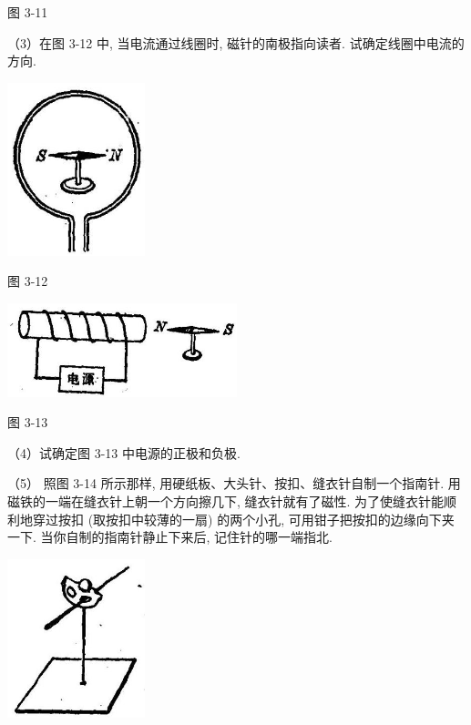 \documentclass[10pt]{article}
\begin{document}
图 3-11

（3）在图 3-12 中, 当电流通过线圈时, 磁针的南极指向读者. 试确定线圈中电流的方向.

\begin{center}
\includegraphics[max width=0.3\textwidth]{images/01913056-1f15-74d8-9184-9aab52c9d66b_109_304164.jpg}
\end{center}

图 3-12

\begin{center}
\includegraphics[max width=0.5\textwidth]{images/01913056-1f15-74d8-9184-9aab52c9d66b_109_456456.jpg}
\end{center}

图 3-13

（4）试确定图 3-13 中电源的正极和负极.

（5） 照图 3-14 所示那样, 用硬纸板、大头针、按扣、缝衣针自制一个指南针. 用磁铁的一端在缝衣针上朝一个方向擦几下, 缝衣针就有了磁性. 为了使缝衣针能顺利地穿过按扣 (取按扣中较薄的一扇) 的两个小孔, 可用钳子把按扣的边缘向下夹一下. 当你自制的指南针静止下来后, 记住针的哪一端指北.

\begin{center}
\includegraphics[max width=0.3\textwidth]{images/01913056-1f15-74d8-9184-9aab52c9d66b_109_548620.jpg}
\end{center}
\end{document}
